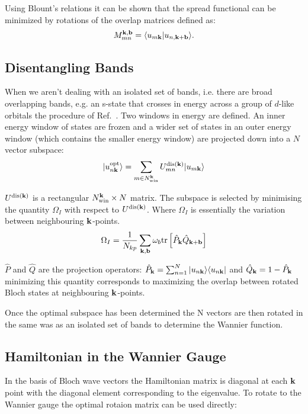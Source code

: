 Using Blount's relations it can be shown that 
the spread functional can be minimized by rotations of the overlap matrices defined as: 
%
\begin{equation}
M_{mn}^{{\bf k},\bf{b}} = \langle u_{m{\bf k}}|u_{n,{\bf k}+\bf{b}} \rangle.
\end{equation}
%

\subsection{Disentangling Bands}
When we aren't dealing with an isolated set of bands, i.e.
there are broad overlapping bands, e.g. an s-state that crosses in energy
across a group of $d$-like orbitals the procedure of Ref.~\cite{souza02}.
Two windows in energy are defined. An inner energy window of states are frozen 
and a wider set of states in an outer energy window (which contains the smaller
energy window) are projected down into a $N$ vector subspace:
%
\begin{equation}
|u^{\rm opt}_{n{\bf k}}\rangle = \sum_{m \in N_{\rm win}^{{\bf k}}} U_{mn}^{{\rm dis}({\bf k})}|u_{m{\bf k}}\rangle
\end{equation}
%

$U^{{\rm dis}({\bf k})}$ is a rectangular $N_{\rm win}^{{\bf k}} \times N$ matrix. 
The subspace is selected by minimising the quantity $\Omega_{I}$ with respect to $U^{{\rm dis}({\bf k})}$.
Where $\Omega_{I}$ is essentially the variation between neighbouring ${\bf k}$-points. 
%
\begin{equation}
\Omega_{I} = \frac{1}{N_{kp}} \sum_{{\bf k}, \mathbf{b}} \omega_{b} {\rm tr} \left[\hat{P}_{{\bf k}}\hat{Q}_{{\bf k}+\mathbf{b}}\right]
\end{equation}

$\hat{P}$ and $\hat{Q}$ are the projection operators: 
$\hat{P}_{{\bf k}}=\sum_{n=1}^{N}|u_{n{\bf k}}\rangle \langle u_{n{\bf k}}|$ and $\hat{Q}_{{\bf k}} = 1-\hat{P}_{{\bf k}}$
minimizing this quantity corresponds to maximizing the overlap between rotated Bloch
states at neighbouring ${\bf k}$-points.

Once the optimal subspace has been determined the N vectors are then rotated in the same
was as an isolated set of bands to determine the Wannier function.

\subsection{Hamiltonian in the Wannier Gauge}
In the basis of Bloch wave vectors the Hamiltonian matrix is diagonal at each ${\bf k}$ point
with the diagonal element corresponding to the eigenvalue. To rotate to the 
Wannier gauge the optimal rotaion matrix can be used directly:


